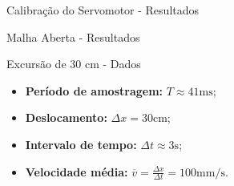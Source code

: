 \documentclass[10pt]{beamer}
\begin{document}
\begin{frame}[fragile]{Calibração do Servomotor - Resultados}

\begin{table}[!ht]
\centering
\caption{Dados de calibração do servomotor, média obtida é de 71.32 mm/unidade\label{calibracaoServomotor}}
\end{table}

\end{frame}

\begin{frame}[fragile]{Malha Aberta - Resultados}
\begin{block}{Excursão de 30 cm - Dados}
\begin{itemize}
	\item \textbf{Período de amostragem: } $T \approx 41 \mathrm{ms}$;
	\item \textbf{Deslocamento: } $\Delta x = 30 \mathrm{cm}$;
	\item \textbf{Intervalo de tempo: } $\Delta t \approx 3 \mathrm{s}$;
	\item \textbf{Velocidade média: } $\overline{v} = \frac{\Delta x}{\Delta t} = 100\mathrm{mm}/\mathrm{s}$.
	
\end{itemize}
\end{block}
\end{frame}
\end{document}
